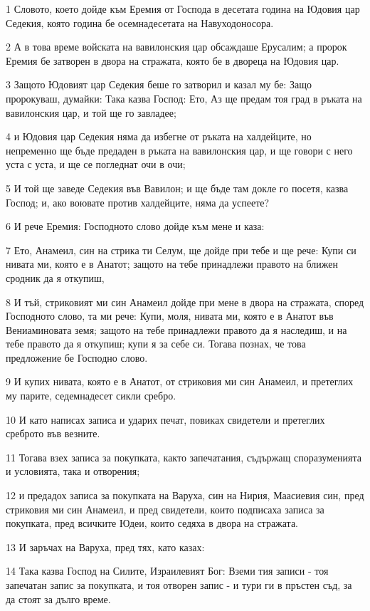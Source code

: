 \par 1 Словото, което дойде към Еремия от Господа в десетата година на Юдовия цар Седекия, която година бе осемнадесетата на Навуходоносора.
\par 2 А в това време войската на вавилонския цар обсаждаше Ерусалим; а пророк Еремия бе затворен в двора на стражата, която бе в двореца на Юдовия цар.
\par 3 Защото Юдовият цар Седекия беше го затворил и казал му бе: Защо пророкуваш, думайки: Така казва Господ: Ето, Аз ще предам тоя град в ръката на вавилонския цар, и той ще го завладее;
\par 4 и Юдовия цар Седекия няма да избегне от ръката на халдейците, но непременно ще бъде предаден в ръката на вавилонския цар, и ще говори с него уста с уста, и ще се погледнат очи в очи;
\par 5 И той ще заведе Седекия във Вавилон; и ще бъде там докле го посетя, казва Господ; и, ако воювате против халдейците, няма да успеете?
\par 6 И рече Еремия: Господното слово дойде към мене и каза:
\par 7 Ето, Анамеил, син на стрика ти Селум, ще дойде при тебе и ще рече: Купи си нивата ми, която е в Анатот; защото на тебе принадлежи правото на ближен сродник да я откупиш,
\par 8 И тъй, стриковият ми син Анамеил дойде при мене в двора на стражата, според Господното слово, та ми рече: Купи, моля, нивата ми, която е в Анатот във Вениаминовата земя; защото на тебе принадлежи правото да я наследиш, и на тебе правото да я откупиш; купи я за себе си. Тогава познах, че това предложение бе Господно слово.
\par 9 И купих нивата, която е в Анатот, от стриковия ми син Анамеил, и претеглих му парите, седемнадесет сикли сребро.
\par 10 И като написах записа и ударих печат, повиках свидетели и претеглих среброто във везните.
\par 11 Тогава взех записа за покупката, както запечатания, съдържащ споразуменията и условията, така и отворения;
\par 12 и предадох записа за покупката на Варуха, син на Нирия, Маасиевия син, пред стриковия ми син Анамеил, и пред свидетели, които подписаха записа за покупката, пред всичките Юдеи, които седяха в двора на стражата.
\par 13 И заръчах на Варуха, пред тях, като казах:
\par 14 Така казва Господ на Силите, Израилевият Бог: Вземи тия записи - тоя запечатан запис за покупката, и тоя отворен запис - и тури ги в пръстен съд, за да стоят за дълго време.
